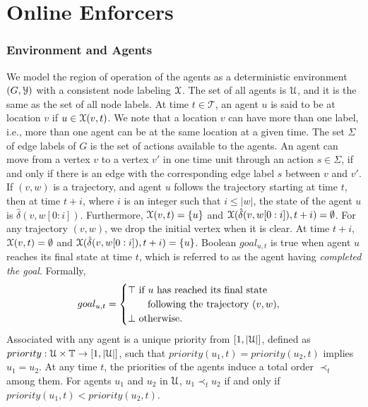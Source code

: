 \section{Online Enforcers}
\label{sec:formulation}

\subsubsection*{Environment and Agents}
We model the region of operation of the agents as a deterministic environment $(G,\mathcal{Y})$ with a consistent node labeling $\mathcal{X}$. The set of all agents is $\mathcal{U}$, and it is the same as the set of all node labels. At time $t \in \mathcal{T}$, an agent $u$ is said to be at location $v$ if $u \in \mathcal{X}(v,t)$. We note that a location $v$ can have more than one label, i.e., more than one agent can be at the same location at a given time. The set $\Sigma$ of edge labels of $G$ is the set of actions available to the agents.
An agent can move from a vertex $v$ to a vertex $v'$ in one time unit through an action $s \in \Sigma$, if and only if there is an edge with the corresponding edge label $s$ between $v$ and $v'$. 
 If $(v,w)$ is a trajectory, and agent $u$ follows the trajectory starting at time $t$, then at time $t+i$, where $i$ is an integer such that $i \leq |w|$, the state of the agent $u$ is $\hat{\delta}(v,w[0:i])$. Furthermore, $\mathcal{X}(v,t) = \{u\}$ and $\mathcal{X}(\hat{\delta}(v,w[0:i]),t+i) = \emptyset$. 
For any trajectory $(v,w)$, we drop the initial vertex when it is clear.
At time $t+i$,  $\mathcal{X}(v,t) = \emptyset$ and $\mathcal{X}(\hat{\delta}(v,w[0:i]),t+i) = \{u\}$.  
Boolean $goal_{u,t}$ is true when agent $u$ reaches its final state at time $t$, which is referred to as the agent having \emph{completed the goal}.
Formally,
\begin{equation}
    goal_{u,t} = \begin{cases}
\top \text{ if } u \text{ has reached its final state} \\ \text{\qquad following the trajectory } (v,w),
\\
\bot \text{ otherwise.}
\end{cases}
\end{equation}
Associated with any agent is a unique priority from $[1,|\mathcal{U}|]$, defined as $priority: \mathcal{U} \times \mathbb{T} \to [1,|\mathcal{U}|]$, such that $priority(u_1,t) = priority(u_2,t)$ implies $u_1 = u_2$. At any time $t$, the priorities of the agents induce a total order $\prec_t$ among them. 
For agents $u_1$ and $u_2$ in $\mathcal{U}$, $u_1 \prec_t u_2$ if and only if $priority(u_1,t) < priority(u_2,t)$.

